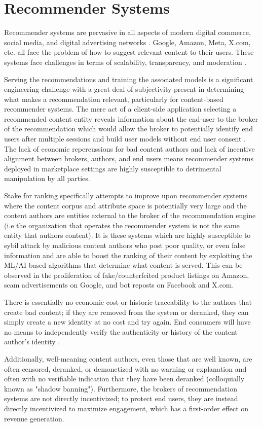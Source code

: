 \section{Recommender Systems}


Recommender systems are pervasive in all aspects of modern digital commerce, social media, and digital advertising networks \cite{resnick1997recommender} \cite{lops2011content} \cite{gomez2015netflix}. Google, Amazon, Meta, X.com, etc. all face the problem of how to suggest relevant content to their users. These systems face challenges in terms of scalability, transparency, and moderation \cite{wang2022trustworthy}. 

Serving the recommendations and training the associated models is a significant engineering challenge with a great deal of subjectivity present in determining what makes a recommendation relevant, particularly for content-based recommender systems. The mere act of a client-side application selecting a recommended content entity reveals information about the end-user to the broker of the recommendation which would allow the broker to potentially identify end users after multiple sessions and build user models without end user consent \cite{boutet2018collaborative}. The lack of economic repercussions for bad content authors and lack of incentive alignment between brokers, authors, and end users means recommender systems deployed in marketplace settings are highly susceptible to detrimental manipulation by all parties.

Stake for ranking specifically attempts to improve upon recommender systems where the content corpus and attribute space is potentially very large and the content authors are entities external to the broker of the recommendation engine (i.e the organization that operates the recommender system is not the same entity that authors content). It is these systems which are highly susceptible to sybil attack by malicious content authors who post poor quality, or even false information and are able to boost the ranking of their content by exploiting the ML/AI based algorithms that determine what content is served. This can be observed in the proliferation of fake/counterfeited product listings on Amazon, scam advertisements on Google, and bot reposts on Facebook and X.com. 

There is essentially no economic cost or historic traceability to the authors that create bad content; if they are removed from the system or deranked, they can simply create a new identity at no cost and try again. End consumers will have no means to independently verify the authenticity or history of the content author's identity \cite{lin2022shilling}. 

Additionally, well-meaning content authors, even those that are well known, are often censored, deranked, or demonetized with no warning or explanation and often with no verifiable indication that they have been deranked (colloquially known as "shadow banning"). Furthermore, the brokers of recommendation systems are not directly incentivized; to protect end users, they are instead directly incentivized to maximize engagement, which has a first-order effect on revenue generation. 
